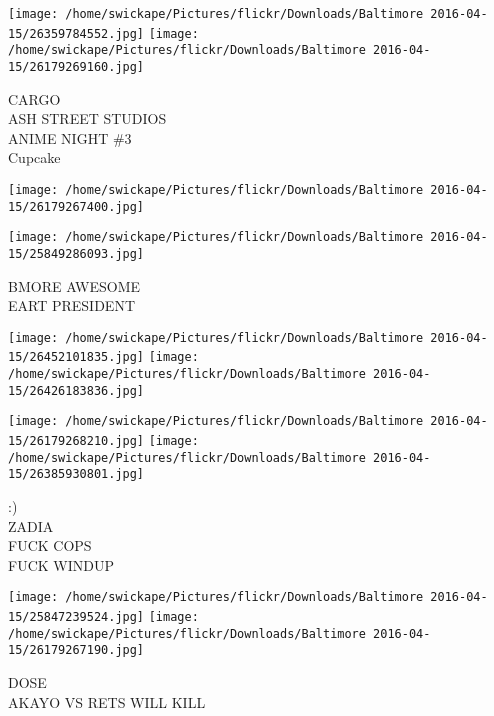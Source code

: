 \documentclass[10pt,letterpaper]{article}
\begin{document}
\texttt{[image: /home/swickape/Pictures/flickr/Downloads/Baltimore 2016-04-15/26359784552.jpg]}
\texttt{[image: /home/swickape/Pictures/flickr/Downloads/Baltimore 2016-04-15/26179269160.jpg]}

CARGO\\
ASH STREET STUDIOS\\
ANIME NIGHT \#3\\
Cupcake
\pagebreak

\texttt{[image: /home/swickape/Pictures/flickr/Downloads/Baltimore 2016-04-15/26179267400.jpg]}

\vspace{0.25in}
\texttt{[image: /home/swickape/Pictures/flickr/Downloads/Baltimore 2016-04-15/25849286093.jpg]}

BMORE AWESOME\\
EART PRESIDENT
\pagebreak

\texttt{[image: /home/swickape/Pictures/flickr/Downloads/Baltimore 2016-04-15/26452101835.jpg]}
\texttt{[image: /home/swickape/Pictures/flickr/Downloads/Baltimore 2016-04-15/26426183836.jpg]}

\texttt{[image: /home/swickape/Pictures/flickr/Downloads/Baltimore 2016-04-15/26179268210.jpg]}
\texttt{[image: /home/swickape/Pictures/flickr/Downloads/Baltimore 2016-04-15/26385930801.jpg]}

:)\\
ZADIA\\
FUCK COPS\\
FUCK WINDUP
\pagebreak

\texttt{[image: /home/swickape/Pictures/flickr/Downloads/Baltimore 2016-04-15/25847239524.jpg]}
\texttt{[image: /home/swickape/Pictures/flickr/Downloads/Baltimore 2016-04-15/26179267190.jpg]}

DOSE\\
AKAYO VS RETS WILL KILL
\pagebreak
\end{document}

